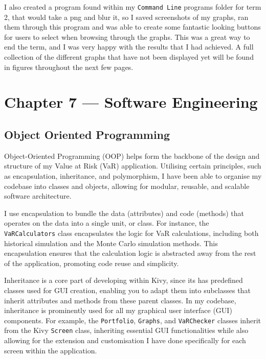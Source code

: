 \documentclass{article}
\begin{document}
I also created a program found within my \texttt{Command Line} programs folder for term 2, that would take a png and blur it, so I saved screenshots of my graphs, ran them through this program and was able to create some fantastic looking buttons for users to select when browsing through the graphs. This was a great way to end the term, and I was very happy with the results that I had achieved. A full collection of the different graphs that have not been displayed yet will be found in figures throughout the next few pages.




\section{Chapter 7 --- Software Engineering}

\subsection{Object Oriented Programming}

Object-Oriented Programming (OOP) helps form the backbone of the design and structure of my Value at Risk (VaR) application. Utilising certain principles, such as encapsulation, inheritance, and polymorphism, I have been able to organise my codebase into classes and objects, allowing for modular, reusable, and scalable software architecture.\\\vspace{0.3cm}

I use encapsulation to bundle the data (attributes) and code (methods) that operates on the data into a single unit, or class. For instance, the \texttt{VaRCalculators} class encapsulates the logic for VaR calculations, including both historical simulation and the Monte Carlo simulation methods. This encapsulation ensures that the calculation logic is abstracted away from the rest of the application, promoting code reuse and simplicity.\\\vspace{0.3cm}

Inheritance is a core part of developing within Kivy, since its has predefined classes used for GUI creation, enabling you to adapt them into subclasses that inherit attributes and methods from these parent classes. In my codebase, inheritance is prominently used for all my graphical user interface (GUI) components. For example, the \texttt{Portfolio}, \texttt{Graphs}, and \texttt{VaRChecker} classes inherit from the Kivy \texttt{Screen} class, inheriting essential GUI functionalities while also allowing for the extension and customisation I have done specifically for each screen within the application.\\\vspace{0.3cm}
\end{document}
